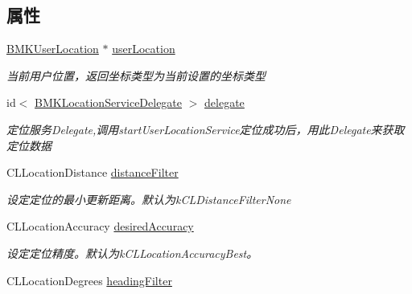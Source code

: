\subsection*{属性}
\begin{DoxyCompactItemize}
\item 
\hypertarget{interface_b_m_k_location_service_a19c6477dc79e94c8e20d7ddf1e52b0c2}{}\hyperlink{interface_b_m_k_user_location}{B\+M\+K\+User\+Location} $\ast$ \hyperlink{interface_b_m_k_location_service_a19c6477dc79e94c8e20d7ddf1e52b0c2}{user\+Location}\label{interface_b_m_k_location_service_a19c6477dc79e94c8e20d7ddf1e52b0c2}

\begin{DoxyCompactList}\small\item\em 当前用户位置，返回坐标类型为当前设置的坐标类型 \end{DoxyCompactList}\item 
\hypertarget{interface_b_m_k_location_service_a6a3767cb278c4dba0a59950586b5e37d}{}id$<$ \hyperlink{protocol_b_m_k_location_service_delegate-p}{B\+M\+K\+Location\+Service\+Delegate} $>$ \hyperlink{interface_b_m_k_location_service_a6a3767cb278c4dba0a59950586b5e37d}{delegate}\label{interface_b_m_k_location_service_a6a3767cb278c4dba0a59950586b5e37d}

\begin{DoxyCompactList}\small\item\em 定位服务\+Delegate,调用start\+User\+Location\+Service定位成功后，用此\+Delegate来获取定位数据 \end{DoxyCompactList}\item 
\hypertarget{interface_b_m_k_location_service_acb15b8ebda25899c2859a3d403a3425d}{}C\+L\+Location\+Distance \hyperlink{interface_b_m_k_location_service_acb15b8ebda25899c2859a3d403a3425d}{distance\+Filter}\label{interface_b_m_k_location_service_acb15b8ebda25899c2859a3d403a3425d}

\begin{DoxyCompactList}\small\item\em 设定定位的最小更新距离。默认为k\+C\+L\+Distance\+Filter\+None \end{DoxyCompactList}\item 
\hypertarget{interface_b_m_k_location_service_a2af9a5961b0553dd49e40e1fcc6feb3d}{}C\+L\+Location\+Accuracy \hyperlink{interface_b_m_k_location_service_a2af9a5961b0553dd49e40e1fcc6feb3d}{desired\+Accuracy}\label{interface_b_m_k_location_service_a2af9a5961b0553dd49e40e1fcc6feb3d}

\begin{DoxyCompactList}\small\item\em 设定定位精度。默认为k\+C\+L\+Location\+Accuracy\+Best。 \end{DoxyCompactList}\item 
\hypertarget{interface_b_m_k_location_service_af9da37d0c21e23368b0cfb06ea0dddea}{}C\+L\+Location\+Degrees \hyperlink{interface_b_m_k_location_service_af9da37d0c21e23368b0cfb06ea0dddea}{heading\+Filter}\label{interface_b_m_k_location_service_af9da37d0c21e23368b0cfb06ea0dddea}


\end{DoxyCompactItemize}

